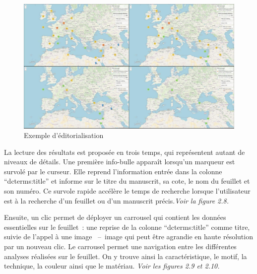 \begin{landscape}
	\begin{figure}[ht]
		\centering
		\includegraphics[scale=0.4]{./textes/chap2/filtre-4.jpg}
		\caption{Exemple d'éditorialisation}
		\label{fig:info}
	\end{figure}
\end{landscape}

La lecture des résultats est proposée en trois temps, qui représentent autant de niveaux de détails. Une première info-bulle apparaît lorsqu’un marqueur est survolé par le curseur. Elle reprend l’information entrée dans la colonne \enquote{dcterms:title} et informe sur le titre du manuscrit, sa cote, le nom du feuillet et son numéro. Ce survole rapide accélère le temps de recherche lorsque l’utilisateur est à la recherche d’un feuillet ou d’un manuscrit précis.\textit{Voir la figure 2.8.}\par

Ensuite, un clic permet de déployer un carrousel qui contient les données essentielles sur le feuillet~: une reprise de la colonne \enquote{dcterms:title} comme titre, suivie de l’appel à une image ~–~image qui peut être agrandie en haute résolution par un nouveau clic. Le carrousel permet une navigation entre les différentes analyses réalisées sur le feuillet. On y trouve ainsi la caractéristique, le motif, la technique, la couleur ainsi que le matériau. \textit{Voir les figures 2.9 et 2.10.}\par


